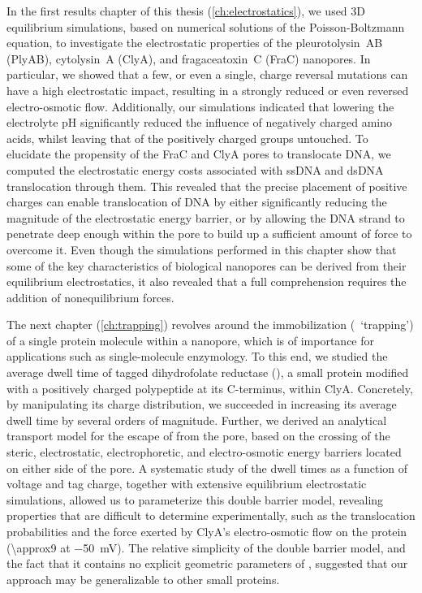 In the first results chapter of this thesis (\cref{ch:electrostatics}), we used 3D equilibrium simulations,
based on numerical solutions of the Poisson-Boltzmann equation, to investigate the electrostatic properties of
the pleurotolysin~AB (PlyAB), cytolysin~A (ClyA), and fragaceatoxin~C (FraC) nanopores. In particular, we
showed that a few, or even a single, charge reversal mutations can have a high electrostatic impact, resulting
in a strongly reduced or even reversed electro-osmotic flow. Additionally, our simulations indicated that
lowering the electrolyte pH significantly reduced the influence of negatively charged amino acids, whilst
leaving that of the positively charged groups untouched. To elucidate the propensity of the FraC and ClyA
pores to translocate DNA, we computed the electrostatic energy costs associated with ssDNA and dsDNA
translocation through them. This revealed that the precise placement of positive charges can enable
translocation of DNA by either significantly reducing the magnitude of the electrostatic energy barrier, or by
allowing the DNA strand to penetrate deep enough within the pore to build up a sufficient amount of force to overcome it.
Even though the simulations performed in this chapter show that some of the key characteristics of biological
nanopores can be derived from their equilibrium electrostatics, it also revealed that a full comprehension
requires the addition of nonequilibrium forces.

The next chapter (\cref{ch:trapping}) revolves around the immobilization (\ie~`trapping') of a single protein
molecule within a nanopore, which is of importance for applications such as single-molecule enzymology. To
this end, we studied the average dwell time of tagged dihydrofolate reductase (\DHFRt{}), a small protein
modified with a positively charged polypeptide at its C-terminus, within ClyA. Concretely, by manipulating its
charge distribution, we succeeded in increasing its average dwell time by several orders of magnitude.
Further, we derived an analytical transport model for the escape of \DHFRt{} from the pore, based on the
crossing of the steric, electrostatic, electrophoretic, and electro-osmotic energy barriers located on either
side of the pore. A systematic study of the dwell times as a function of voltage and tag charge, together with
extensive equilibrium electrostatic simulations, allowed us to parameterize this double barrier model,
revealing properties that are difficult to determine experimentally, such as the translocation probabilities
and the force exerted by ClyA's electro-osmotic flow on the protein (\SI{\approx9}{\pN} at \SI{-50}{\mV}). The
relative simplicity of the double barrier model, and the fact that it contains no explicit geometric
parameters of \DHFRt{}, suggested that our approach may be generalizable to other small proteins.

